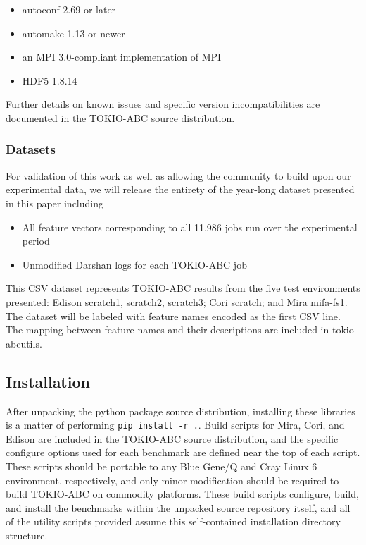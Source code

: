 \begin{itemize}
\item autoconf 2.69 or later
\item automake 1.13 or newer
\item an MPI 3.0-compliant implementation of MPI
\item HDF5 1.8.14
\end{itemize}

Further details on known issues and specific version incompatibilities are documented in the TOKIO-ABC source distribution.

\subsubsection{Datasets}

For validation of this work as well as allowing the community to build upon our experimental data, we will release the entirety of the year-long dataset presented in this paper including

\begin{itemize}
\item All feature vectors corresponding to all 11,986 jobs run over the experimental period
\item Unmodified Darshan logs for each TOKIO-ABC job
\end{itemize}

This CSV dataset represents TOKIO-ABC results from the five test environments presented:
Edison scratch1, scratch2, scratch3; Cori scratch; and Mira mifa-fs1.
The dataset will be labeled with feature names encoded as the first CSV line.
  The mapping between feature names and their descriptions are included in tokio-abcutils.

\subsection{Installation}

After unpacking the python package source distribution, installing these libraries is a matter of performing \texttt{{pip install -r .}}.
Build scripts for Mira, Cori, and Edison are included in the TOKIO-ABC source distribution, and the specific configure options used for each benchmark are defined near the top of each script.
These scripts should be portable to any Blue Gene/Q and Cray Linux 6 environment, respectively, and only minor modification should be required to build TOKIO-ABC on commodity platforms.
These build scripts configure, build, and install the benchmarks within the unpacked source repository itself, and all of the utility scripts provided assume this self-contained installation directory structure.

